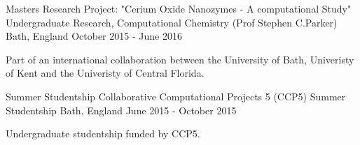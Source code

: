 \begin{cventries}
  \cventry
    {Masters Research Project: "Cerium Oxide Nanozymes - A computational Study"}
    {Undergraduate Research, Computational Chemistry (Prof Stephen C.Parker)}
    {Bath, England}
    {October 2015 - June 2016}
    {
      \begin{cvitems}
        \item{Part of an international collaboration between the University of Bath, Univeristy of Kent and the Univeristy of Central Florida.} 
      \end{cvitems} 
    }
    
    \cventry
    {Summer Studentship}
    {Collaborative Computational Projects 5 (CCP5) Summer Studentship}
    {Bath, England}
    {June 2015 - October 2015}
    {
      \begin{cvitems}
        \item {Undergraduate studentship funded by CCP5.}
      \end{cvitems}
    }
\end{cventries}
